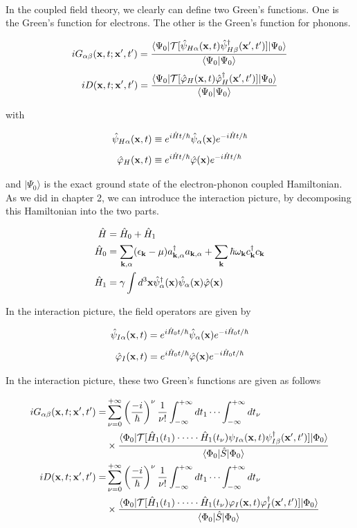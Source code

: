 \

In the coupled field theory, we clearly can define two Green's functions. One is the Green's function for electrons. The other is the Green's function for phonons.

\[iG_{\alpha\beta}({\bf x},t;{\bf x'},t') = \frac{\langle\Psi_0|\mathcal{T}[\hat\psi_{H\alpha}({\bf x},t)\hat\psi_{H\beta}^\dagger({\bf x'},t')]|\Psi_0\rangle}{\langle\Psi_0|\Psi_0\rangle} \]
\[iD({\bf x},t;{\bf x'},t') = \frac{\langle\Psi_0|\mathcal{T}[\hat\varphi_{H}({\bf x},t)\hat\varphi_{H}^\dagger({\bf x'},t')]|\Psi_0\rangle}{\langle\Psi_0|\Psi_0\rangle}  \]

with 

\[\hat\psi_{H\alpha}({\bf x},t) \equiv e^{i\hat Ht/\hbar}\hat\psi_\alpha({\bf x})e^{-i\hat Ht/\hbar} \]
\[\hat\varphi_{H}({\bf x},t) \equiv e^{i\hat Ht/\hbar}\hat\varphi({\bf x})e^{-i\hat Ht/\hbar} \]

and $|\Psi_0\rangle$ is the exact ground state of the electron-phonon coupled Hamiltonian. As we did in chapter 2, we can introduce the interaction picture, by decomposing this Hamiltonian into the two parts. 

\[\begin{split}
\hat H &= \hat H_0 + \hat H_1 \\
\hat H_0 &= \sum_{\bf k,\alpha}(\epsilon_{\bf k}-\mu)a_{\bf k,\alpha}^\dagger a_{\bf k,\alpha} + \sum_{\bf k}\hbar\omega_{\bf k}c_{\bf k}^\dagger c_{\bf k}\\
\hat H_1 &= \gamma\int d^3{\bf x}\hat\psi_\alpha^\dagger({\bf x})\hat\psi_\alpha({\bf x})\hat\varphi({\bf x})
\end{split}\]

In the interaction picture, the field operators are given by 

\[\hat\psi_{I\alpha}({\bf x},t) = e^{i\hat H_0t/\hbar}\hat\psi_\alpha({\bf x})e^{-i\hat H_0t/\hbar} \]
\[\hat\varphi_{I}({\bf x},t) = e^{i\hat H_0t/\hbar}\hat\varphi({\bf x})e^{-i\hat H_0t/\hbar} \]

In the interaction picture, these two Green's functions are given as follows

\[\begin{split}
iG_{\alpha\beta}({\bf x},t;{\bf x'},t') =& \sum_{\nu = 0}^{+\infty}\left(\frac{-i}{\hbar}\right)^\nu\frac{1}{\nu!}\int_{-\infty}^{+\infty}dt_1\cdots\int_{-\infty}^{+\infty}dt_\nu\\
&\times \frac{\langle\Phi_0|\mathcal{T}[\hat H_1(t_1)\cdot\cdots\cdot\hat H_1(t_\nu)\psi_{I\alpha}({\bf x},t)\psi_{I\beta}^
\dagger({\bf x'},t')]|\Phi_0\rangle}{\langle\Phi_0|\hat S|\Phi_0\rangle}\\
iD({\bf x},t;{\bf x'},t') =& \sum_{\nu = 0}^{+\infty}\left(\frac{-i}{\hbar}\right)^\nu\frac{1}{\nu!}\int_{-\infty}^{+\infty}dt_1\cdots\int_{-\infty}^{+\infty}dt_\nu\\
&\times \frac{\langle\Phi_0|\mathcal{T}[\hat H_1(t_1)\cdot\cdots\cdot\hat H_1(t_\nu)\varphi_{I}({\bf x},t)\varphi_{I}^
\dagger({\bf x'},t')]|\Phi_0\rangle}{\langle\Phi_0|\hat S|\Phi_0\rangle}
\end{split} \]


